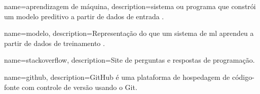 {
    name=aprendizagem de máquina,
    description={sistema ou programa que constrói um modelo preditivo a partir de dados de entrada \cite{glossary-ml}.}
}

{
    name=modelo,
    description={Representação do que um sistema de \gls{ml} aprendeu a partir de dados de treinamento \cite{glossary-ml}.}
}

{
    name=stackoverflow,
    description={Site de perguntas e respostas de programação.}
}

{
    name=github,
    description={GitHub é uma plataforma de hospedagem de código-fonte com controle de versão usando o Git.}
}



